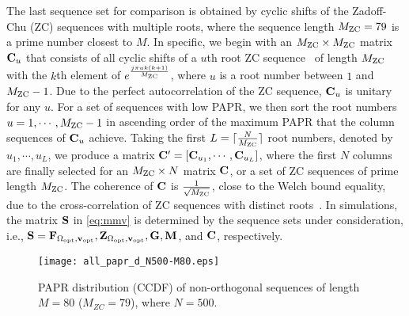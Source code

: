\documentclass[journal]{IEEEtran}
\newcommand{\vbu}{{\bf v}}
\newcommand{\Cbu}{{\bf C}}
\newcommand{\Fbu}{{\bf F}}
\newcommand{\Mbu}{{\bf M}}
\newcommand{\Sbu}{{\bf S}}
\newcommand{\Gbu}{{\bf G}}
\newcommand{\Zbu}{{\bf Z}}
\numberwithin{const2}{const}
\begin{document}
The last sequence set for comparison 
is obtained by cyclic shifts of the Zadoff-Chu (ZC) sequences with multiple roots,
where the sequence length $M_{\rm ZC}=79$ is a prime number closest to $M$.
In specific, we begin with an 
$M_{\rm ZC} \times M_{\rm ZC}$ matrix $\Cbu_u$
that consists of all cyclic shifts of 
a $u$th root ZC sequence~\cite{Chu:ZC} of length $M_{\rm ZC}$ with the $k$th element of 
$e^{ \frac{j \pi u k(k+1)}{M_{\rm ZC}} }$, where $u$
is a root number between $1$ and $ M_{\rm ZC}-1$.
Due to the perfect autocorrelation of the ZC sequence, 
$\Cbu_u$ is unitary for any $u$.
For a set of sequences with low PAPR,
we then sort the root numbers $ u=1, \cdots, M_{\rm ZC}-1$
in ascending order of the maximum PAPR
that the column sequences of $\Cbu_u$ achieve.
Taking the first $L = \lceil \frac{N}{M_{\rm ZC}} \rceil$ root numbers, denoted by $u_1, \cdots, u_L$,
we produce a matrix $\Cbu' =  [\Cbu_{u_1}, \cdots, \Cbu_{u_L} ]$,
where the first $N$ columns are finally selected for
an $M_{\rm ZC} \times N$ matrix $\Cbu$, or 
a set of ZC sequences of prime length $M_{\rm ZC}$.
The coherence of $\Cbu$ is $\frac{1}{\sqrt{M_{\rm ZC}}}$, close to the Welch bound equality, 
due to the cross-correlation of ZC sequences with distinct roots~\cite{Sarwate:bound}. 
In simulations, 
the matrix $\Sbu$ in \eqref{eq:mmv} is determined by
the sequence sets under consideration, i.e.,
$\Sbu = \Fbu_{\Omega_{\rm opt}, \vbu_{\rm opt}}, \Zbu_{\Omega_{\rm opt}, \vbu_{\rm opt}}, 
\Gbu, \Mbu$, and $\Cbu$, respectively. 





\begin{figure}[!t]
	\centering
	\texttt{[image: all\_papr\_d\_N500-M80.eps]}
	\caption{PAPR distribution (CCDF) of non-orthogonal sequences of length $M=80$ ($M_{ZC} = 79$), where $N=500$.}
	\label{fig:all_pd}
\end{figure}
\end{document}
